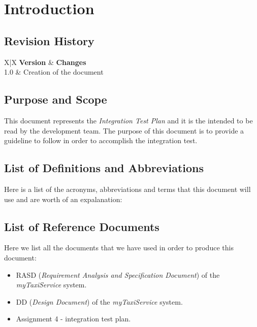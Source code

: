 \section{Introduction} %
\label{sec:introduction}

\subsection{Revision History} %
\label{sub:revision_history}
\begin{tabularx}{\textwidth}{ X|X }
	\textbf{Version} & \textbf{Changes} \\
	 {1.0} & Creation of the document \\
\end{tabularx}

\subsection{Purpose and Scope} %
\label{sub:purpose_and_scope}

This document represents the \emph{Integration Test Plan} and it is the intended to be read by the development team.
The purpose of this document is to provide a guideline to follow in order to accomplish the integration test.


\subsection{List of Definitions and Abbreviations} %
\label{sub:definitions_and_abbreviations}
Here is a list of the acronyms, abbreviations and terms that this document will use and are worth of an expalanation:

\subsection{List of Reference Documents} %
\label{sub:reference_documents}
Here we list all the documents that we have used in order to produce this document:
\begin{itemize}
	\item RASD (\emph{Requirement Analysis and Specification Document}) of the \emph{myTaxiService} system.
	\item DD (\emph{Design Document}) of the \emph{myTaxiService} system.
	\item Assignment 4 - integration test plan.
\end{itemize}
